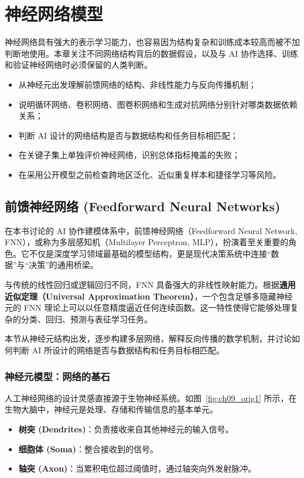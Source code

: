 ﻿\chapter{神经网络模型}

神经网络具有强大的表示学习能力，也容易因为结构复杂和训练成本较高而被不加判断地使用。本章关注不同网络结构背后的数据假设，以及与 AI 协作选择、训练和验证神经网络时必须保留的人类判断。

\begin{chapterguide}
\begin{itemize}
  \item 从神经元出发理解前馈网络的结构、非线性能力与反向传播机制；
  \item 说明循环网络、卷积网络、图卷积网络和生成对抗网络分别针对哪类数据依赖关系；
  \item 判断 AI 设计的网络结构是否与数据结构和任务目标相匹配；
  \item 在关键子集上单独评价神经网络，识别总体指标掩盖的失败；
  \item 在采用公开模型之前检查跨地区泛化、近似重复样本和捷径学习等风险。
\end{itemize}
\end{chapterguide}

\section{前馈神经网络 (Feedforward Neural Networks)}
\label{sec:fnn}

在本书讨论的 AI 协作建模体系中，前馈神经网络（Feedforward Neural Network, FNN），或称为多层感知机（Multilayer Perceptron, MLP），扮演着至关重要的角色。它不仅是深度学习领域最基础的模型结构，更是现代决策系统中连接“数据”与“决策”的通用桥梁。

与传统的线性回归或逻辑回归不同，FNN 具备强大的非线性映射能力。根据\textbf{通用近似定理（Universal Approximation Theorem）}，一个包含足够多隐藏神经元的 FNN 理论上可以以任意精度逼近任何连续函数。这一特性使得它能够处理复杂的分类、回归、预测与表征学习任务。

本节从神经元结构出发，逐步构建多层网络，解释反向传播的数学机制，并讨论如何判断 AI 所设计的网络是否与数据结构和任务目标相匹配。

\subsection{神经元模型：网络的基石}
\label{subsec:neuron_model}

人工神经网络的设计灵感直接源于生物神经系统。如图~\ref{fig:ch09_orig1} 所示，在生物大脑中，神经元是处理、存储和传输信息的基本单元。
\begin{itemize}
    \item \textbf{树突 (Dendrites)}：负责接收来自其他神经元的输入信号。
    \item \textbf{细胞体 (Soma)}：整合接收到的信号。
    \item \textbf{轴突 (Axon)}：当累积电位超过阈值时，通过轴突向外发射脉冲。
\end{itemize}

